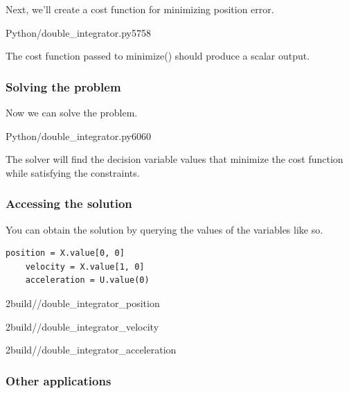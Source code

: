 Next, we'll create a cost function for minimizing position error.
\begin{coderemotesubset}{Python}{\chapterpath/double_integrator.py}{57}{58}
\end{coderemotesubset}

The cost function passed to minimize() should produce a scalar output.

\subsubsection{Solving the problem}

Now we can solve the problem.
\begin{coderemotesubset}{Python}{\chapterpath/double_integrator.py}{60}{60}
\end{coderemotesubset}

The solver will find the decision variable values that minimize the cost
function while satisfying the constraints.

\subsubsection{Accessing the solution}

You can obtain the solution by querying the values of the variables like so.
\begin{code}
  \begin{lstlisting}[style=customPython]
    position = X.value[0, 0]
    velocity = X.value[1, 0]
    acceleration = U.value(0)
  \end{lstlisting}
\end{code}
\begin{bookfigure}
  \begin{minisvg}{2}{build/\chapterpath/double_integrator_position}
    \caption{Double integrator position}
  \end{minisvg}
  \hfill
  \begin{minisvg}{2}{build/\chapterpath/double_integrator_velocity}
    \caption{Double integrator velocity}
  \end{minisvg}
  \hfill
  \begin{minisvg}{2}{build/\chapterpath/double_integrator_acceleration}
    \caption{Double integrator acceleration}
  \end{minisvg}
\end{bookfigure}

\subsubsection{Other applications}

